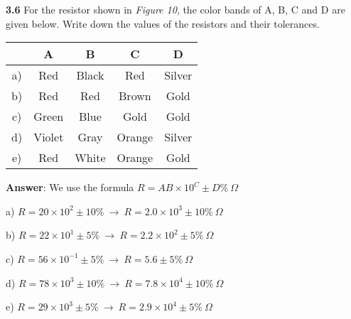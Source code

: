 \documentclass{article}
\begin{document}
{\vspace{8mm}}

{\Large \textbf{3.6} For the resistor shown in \textit{Figure 10}, the color bands of A, B, C and D are given below. Write down the values of the resistors and their tolerances.}

\begin{center}
    \Large
    \begin{tabular}{ |c|c c c c| } 
    \hline
        & A & B & C & D \\
        \hline
        a)& Red & Black & Red & Silver\\
        \hline
        b)& Red & Red & Brown & Gold \\
        \hline
        c)& Green & Blue & Gold & Gold \\ 
        \hline
        d)& Violet & Gray & Orange & Silver \\ 
        \hline
        e)& Red & White & Orange & Gold \\ 
        \hline
    \end{tabular}
\end{center}

\vspace{4mm}

{\Large \textbf{Answer}: We use the formula $R = AB \times 10^{C} \pm D\% \ \Omega$}

{\Large a) $R = 20 \times 10^{2} \pm10\% \ \rightarrow \ \boxed{R = 2.0 \times 10^{3} \pm 10\% \ \Omega}$}

{\Large b) $R = 22 \times 10^{1} \pm5\% \ \rightarrow \ \boxed{R = 2.2 \times 10^{2} \pm 5\% \ \Omega}$ }

{\Large c) $R = 56 \times 10^{-1} \pm5\% \ \rightarrow \ \boxed{R = 5.6 \pm 5\% \ \Omega}$}

{\Large d) $R = 78 \times 10^{3} \pm10\% \ \rightarrow \ \boxed{R = 7.8 \times 10^{4} \pm 10\% \ \Omega}$}

{\Large e) $R = 29 \times 10^{3} \pm5\% \ \rightarrow \ \boxed{R = 2.9 \times 10^{4} \pm 5\% \ \Omega}$}
\end{document}

